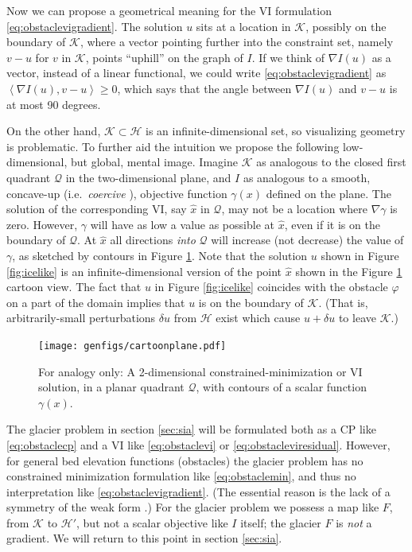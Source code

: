\documentclass[letterpaper,final,12pt,reqno]{amsart}
\theoremstyle{claim}
\newcommand{\ip}[2]{\left<#1,#2\right>}
\numberwithin{equation}{section}
\numberwithin{figure}{section}
\numberwithin{table}{section}
\numberwithin{theorem}{section}
\begin{document}
Now we can propose a geometrical meaning for the VI formulation \eqref{eq:obstaclevigradient}.  The solution $u$ sits at a location in $\mathcal{K}$, possibly on the boundary of $\mathcal{K}$, where a vector pointing further into the constraint set, namely $v-u$ for $v$ in $\mathcal{K}$, points ``uphill'' on the graph of $I$.  If we think of $\nabla I(u)$ as a vector, instead of a linear functional, we could write \eqref{eq:obstaclevigradient} as $\ip{\nabla I(u)}{v-u} \ge 0$, which says that the angle between $\nabla I(u)$ and $v-u$ is at most 90 degrees.

On the other hand, $\mathcal{K} \subset \mathcal{H}$ is an infinite-dimensional set, so visualizing geometry is problematic.  To further aid the intuition we propose the following low-dimensional, but global, mental image.  Imagine $\mathcal{K}$ as analogous to the closed first quadrant $\mathcal{Q}$ in the two-dimensional plane, and $I$ as analogous to a smooth, concave-up (i.e.~\emph{coercive} \cite{Evans2010}), objective function $\gamma(x)$ defined on the plane.  The solution of the corresponding VI, say $\hat x$ in $\mathcal{Q}$, may not be a location where $\nabla \gamma$ is zero.  However, $\gamma$ will have as low a value as possible at $\hat x$, even if it is on the boundary of $\mathcal{Q}$.  At $\hat x$ all directions \emph{into} $\mathcal{Q}$ will increase (not decrease) the value of $\gamma$, as sketched by contours in Figure \ref{fig:cartoonplane}.  Note that the solution $u$ shown in Figure \ref{fig:icelike} is an infinite-dimensional version of the point $\hat x$ shown in the Figure \ref{fig:cartoonplane} cartoon view.  The fact that $u$ in Figure \ref{fig:icelike} coincides with the obstacle $\varphi$ on a part of the domain implies that $u$ is on the boundary of $\mathcal{K}$.  (That is, arbitrarily-small perturbations $\delta u$ from $\mathcal{H}$ exist which cause $u+\delta u$ to leave $\mathcal{K}$.)

\begin{figure}
\texttt{[image: genfigs/cartoonplane.pdf]}
\caption{For analogy only:  A 2-dimensional constrained-minimization or VI solution, in a planar quadrant $\mathcal{Q}$, with contours of a scalar function $\gamma(x)$.}
\label{fig:cartoonplane}
\end{figure}

The glacier problem in section \ref{sec:sia} will be formulated both as a CP like \eqref{eq:obstaclecp} and a VI like \eqref{eq:obstaclevi} or \eqref{eq:obstacleviresidual}.  However, for general bed elevation functions (obstacles) the glacier problem has no constrained minimization formulation like \eqref{eq:obstaclemin}, and thus no interpretation like \eqref{eq:obstaclevigradient}.  (The essential reason is the lack of a symmetry of the weak form \cite{JouvetBueler2012}.)  For the glacier problem we possess a map like $F$, from $\mathcal{K}$ to $\mathcal{H}'$, but not a scalar objective like $I$ itself; the glacier $F$ is \emph{not} a gradient.  We will return to this point in section \ref{sec:sia}.
\end{document}
